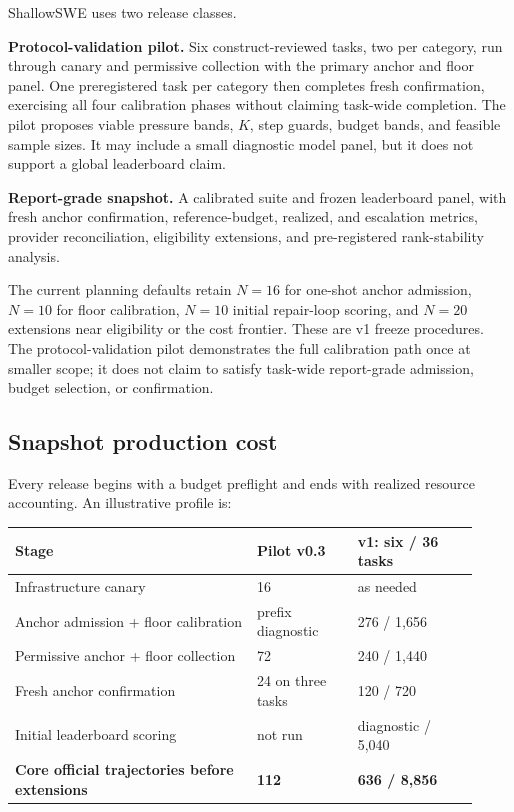 \documentclass[11pt]{article}
\begin{document}
ShallowSWE uses two release classes.

\textbf{Protocol-validation pilot.} Six construct-reviewed tasks, two per category, run through canary and permissive collection with the primary anchor and floor panel. One preregistered task per category then completes fresh confirmation, exercising all four calibration phases without claiming task-wide completion. The pilot proposes viable pressure bands, $K$, step guards, budget bands, and feasible sample sizes. It may include a small diagnostic model panel, but it does not support a global leaderboard claim.

\textbf{Report-grade snapshot.} A calibrated suite and frozen leaderboard panel, with fresh anchor confirmation, reference-budget, realized, and escalation metrics, provider reconciliation, eligibility extensions, and pre-registered rank-stability analysis.

The current planning defaults retain $N=16$ for one-shot anchor admission, $N=10$ for floor calibration, $N=10$ initial repair-loop scoring, and $N=20$ extensions near eligibility or the cost frontier. These are v1 freeze procedures. The protocol-validation pilot demonstrates the full calibration path once at smaller scope; it does not claim to satisfy task-wide report-grade admission, budget selection, or confirmation.

\subsection{Snapshot production cost}\hypertarget{105-snapshot-production-cost}{}\label{105-snapshot-production-cost}

Every release begins with a budget preflight and ends with realized resource accounting. An illustrative profile is:

\begin{longtable}{@{}p{0.48\linewidth}p{0.20\linewidth}p{0.24\linewidth}@{}}
\hline
Stage & Pilot v0.3 & v1: six / 36 tasks\\
\hline
Infrastructure canary & 16 & as needed\\
Anchor admission + floor calibration & prefix diagnostic & 276 / 1,656\\
Permissive anchor + floor collection & 72 & 240 / 1,440\\
Fresh anchor confirmation & 24 on three tasks & 120 / 720\\
Initial leaderboard scoring & not run & diagnostic / 5,040\\
\textbf{Core official trajectories before extensions} & \textbf{112} & \textbf{636 / 8,856}\\
\hline
\end{longtable}
\end{document}
